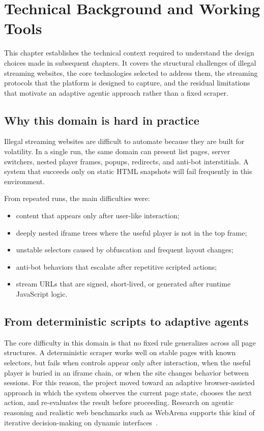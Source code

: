 \chapter{Technical Background and Working Tools}

This chapter establishes the technical context required to understand the design choices
made in subsequent chapters. It covers the structural challenges of illegal streaming
websites, the core technologies selected to address them, the streaming protocols that
the platform is designed to capture, and the residual limitations that motivate an
adaptive agentic approach rather than a fixed scraper.

\section{Why this domain is hard in practice}

Illegal streaming websites are difficult to automate because they are built for volatility. In a single run, the same domain can present list pages, server switchers, nested player frames, popups, redirects, and anti-bot interstitials. A system that succeeds only on static HTML snapshots will fail frequently in this environment.

From repeated runs, the main difficulties were:

\begin{itemize}
  \item content that appears only after user-like interaction;
  \item deeply nested iframe trees where the useful player is not in the top frame;
  \item unstable selectors caused by obfuscation and frequent layout changes;
  \item anti-bot behaviors that escalate after repetitive scripted actions;
  \item stream URLs that are signed, short-lived, or generated after runtime JavaScript logic.
\end{itemize}

\section{From deterministic scripts to adaptive agents}

The core difficulty in this domain is that no fixed rule generalizes across all page
structures. A deterministic scraper works well on stable pages with known selectors, but
fails when controls appear only after interaction, when the useful player is buried in an
iframe chain, or when the site changes behavior between sessions. For this reason, the
project moved toward an adaptive browser-assisted approach in which the system observes the
current page state, chooses the next action, and re-evaluates the result before proceeding.
Research on agentic reasoning and realistic web benchmarks such as WebArena supports this
kind of iterative decision-making on dynamic interfaces~\cite{agent-survey,webarena}.

